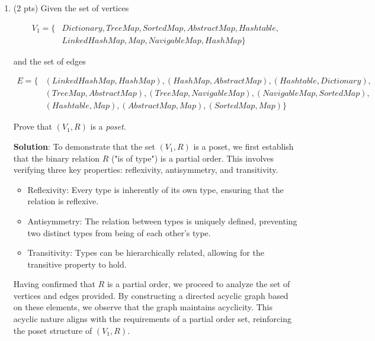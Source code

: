 \documentclass[12pt]{article}
\begin{document}
\begin{spacing}{1.5}
\begin{enumerate}
		\item (2 pts) Given the set of vertices
		      
		      \begin{align*}
		      	V_1= \{ & Dictionary, TreeMap, SortedMap, AbstractMap, Hashtable, \\
		      	        & LinkedHashMap, Map, NavigableMap, HashMap\}             
		      \end{align*}
		              
		      and the set of edges
		      
		      \begin{align*}
		      	E = \{ & (LinkedHashMap, HashMap), (HashMap, AbstractMap), (Hashtable, Dictionary),  \\
		      	       & (TreeMap, AbstractMap), (TreeMap, NavigableMap), (NavigableMap, SortedMap), \\
		      	       & (Hashtable, Map), (AbstractMap, Map), (SortedMap, Map) \}                   
		      \end{align*}
		      
		      Prove that $(V_1, R)$ is a \textit{poset}.
		      
		      \textbf{Solution}:  To demonstrate that the set $(V_1, R)$ is a poset, we first establish that the binary relation $R$ ("is of type") is a partial order. This involves verifying three key properties: reflexivity, antisymmetry, and transitivity.

            \begin{itemize}
                \item Reflexivity: Every type is inherently of its own type, ensuring that the relation is reflexive.
        
                \item Antisymmetry: The relation between types is uniquely defined, preventing two distinct types from being of each other's type.
        
                \item Transitivity: Types can be hierarchically related, allowing for the transitive property to hold.
        
            \end{itemize} 

            Having confirmed that $R$ is a partial order, we proceed to analyze the set of vertices and edges provided. By constructing a directed acyclic graph based on these elements, we observe that the graph maintains acyclicity. This acyclic nature aligns with the requirements of a partial order set, reinforcing the poset structure of $(V_1, R)$. 
            

\end{enumerate}
\end{spacing}
\end{document}
